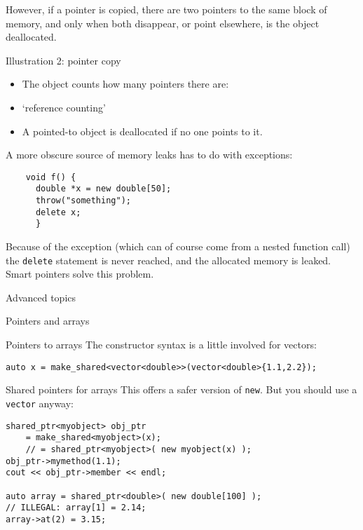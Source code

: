 However, if a pointer is copied, there are two pointers to the same
block of memory, and only when both disappear, or point elsewhere, is
the object deallocated.

\begin{block}{Illustration 2: pointer copy}
  \label{sl:shared-ptr-copy}
  \begin{itemize}
  \item The object counts how many pointers there are:
  \item `reference counting'
  \item A pointed-to object is deallocated if no one points to it.
  \end{itemize}
\end{block}

\begin{remark}
  A more obscure source of memory leaks has to do with exceptions:
  \begin{lstlisting}
    void f() {
      double *x = new double[50];
      throw("something");
      delete x;
      }
  \end{lstlisting}
  Because of the exception
  (which can of course come from a nested function call)
  the \lstinline{delete} statement is never reached,
  and the allocated memory is leaked.
  Smart pointers solve this problem.
\end{remark}

 {Advanced topics}

 {Pointers and arrays}

\begin{block}{Pointers to arrays}
  \label{sl:shared-vector}
  The constructor syntax is a little involved for vectors:
\begin{lstlisting}
auto x = make_shared<vector<double>>(vector<double>{1.1,2.2});
\end{lstlisting}
\end{block}

\begin{slide}{Shared pointers for arrays}
This offers a safer version of \lstinline{new}. But you should use a
\lstinline{vector} anyway:
\begin{lstlisting}
shared_ptr<myobject> obj_ptr
    = make_shared<myobject>(x);
    // = shared_ptr<myobject>( new myobject(x) );
obj_ptr->mymethod(1.1);
cout << obj_ptr->member << endl;

auto array = shared_ptr<double>( new double[100] );
// ILLEGAL: array[1] = 2.14;
array->at(2) = 3.15;
\end{lstlisting}
\end{slide}

